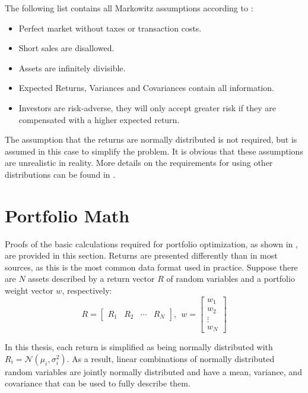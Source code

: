 \documentclass[
  oneside]{book}
\providecommand{\tightlist}{%
  \setlength{\itemsep}{0pt}\setlength{\parskip}{0pt}}
\begin{document}
The following list contains all Markowitz assumptions according to \citep{Mari2005}:

\begin{itemize}
\tightlist
\item
  Perfect market without taxes or transaction costs.
\item
  Short sales are disallowed.
\item
  Assets are infinitely divisible.
\item
  Expected Returns, Variances and Covariances contain all information.
\item
  Investors are risk-adverse, they will only accept greater risk if they
  are compensated with a higher expected return.
\end{itemize}

The assumption that the returns are normally distributed is not required, but is assumed in this case to simplify the problem. It is obvious that these assumptions are unrealistic in reality. More details on the requirements for using other distributions can be found in \citep{Mari2005}.

\hypertarget{portfolio-math}{%
\section{Portfolio Math}\label{portfolio-math}}

Proofs of the basic calculations required for portfolio optimization, as shown in \citep{Eric2021}, are provided in this section. Returns are presented differently than in most sources, as this is the most common data format used in practice. Suppose there are \(N\) assets described by a return vector \(R\) of random variables and a portfolio weight vector \(w\), respectively:
\[
  R = 
  \begin{bmatrix}
    R_{1} & R_{2} & \cdots & R_{N}  
 \end{bmatrix}
 , \ \ 
 w = 
  \begin{bmatrix}
    w_{1} \\ 
    w_{2} \\
    \vdots \\
    w_{N}  
 \end{bmatrix}
\]

In this thesis, each return is simplified as being normally distributed with \(R_i = \mathcal{N}(\mu_i, \sigma_i^2)\). As a result, linear combinations of normally distributed random variables are jointly normally distributed and have a mean, variance, and covariance that can be used to fully describe them.
\end{document}
